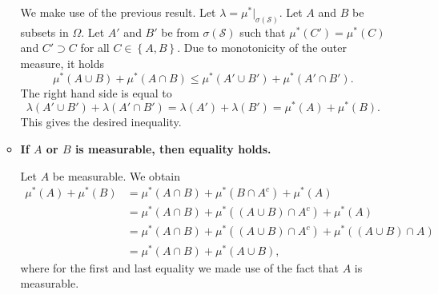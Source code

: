 \documentclass{article}
\begin{document}
\begin{enumerate}[label=(\roman*)]
\begin{itemize}
        We make use of the previous result. Let $\lambda = \mu^*|_{\sigma(\mathcal{S})}$. Let $A$ and $B$ be subsets in $\Omega$. Let $A'$ and $B'$ be from $\sigma(\mathcal{S})$ such that $\mu^*(C') = \mu^*(C)$ and $C' \supset C$ for all $C \in \left\{ A,B \right\}$. Due to monotonicity of the outer measure, it holds 
        $$
            \mu^*(A \cup B) + \mu^*(A \cap B) \leq \mu^*(A' \cup B') + \mu^*(A' \cap B').
        $$
        The right hand side is equal to 
        $$
            \lambda(A' \cup B') + \lambda(A' \cap B') = \lambda(A') + \lambda(B') = \mu^*(A) + \mu^*(B).
        $$  
        This gives the desired inequality.

        \item \textbf{If $A$ or $B$ is measurable, then equality holds.}

        Let $A$ be measurable. We obtain
        \begin{align*}
            \mu^*(A) + \mu^*(B) &= \mu^*(A \cap B) + \mu^*(B \cap A^c) + \mu^*(A) \\
            &= \mu^*(A \cap B) + \mu^*( (A \cup B) \cap A^c) + \mu^*(A) \\
            &= \mu^*(A \cap B) + \mu^*( (A \cup B) \cap A^c) + \mu^*((A \cup B) \cap A) \\
            &= \mu^*(A \cap B) + \mu^*(A \cup B),
        \end{align*}
        where for the first and last equality we made use of the fact that $A$ is measurable.
    \end{itemize}
\end{enumerate}
\end{document}
